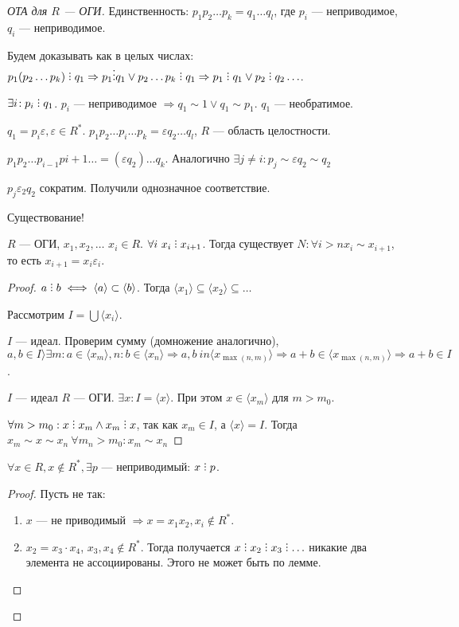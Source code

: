 \begin{proof}[ОТА для $R$ --- ОГИ]
    Единственность: $p_1p_2\ldots p_k =q_1 \ldots q_l$, где $p_i$ --- неприводимое,  $q_i$ --- неприводимое. 

    Будем доказывать как в целых числах:  $p_1(p_2\ldots p_k) \divby q_1 \Rightarrow p_1 \vdots q_1 \lor p_2\ldots p_k \divby q_1 \Rightarrow p_1 \divby q_1 \lor p_2 \divby q_2 \ldots$.

     $\exists i\!: p_i \divby q_1$. $p_i$ --- неприводимое $\Rightarrow q_1 \sim 1 \lor q_1 \sim p_1$. $q_1$ --- необратимое.

     $q_1 = p_i \varepsilon, \varepsilon \in R^*$. $p_1p_2\ldots p_i \ldots p_k = \varepsilon q_2 \ldots q_l$, $R$ --- область целостности.

     $p_1p_2\ldots p_{i-1}p{i+1}\ldots = (\varepsilon q_2) \ldots q_k$. Аналогично $\exists j \neq i\!: p_j \sim \varepsilon q_2 \sim q_2$ 

     $p_j \varepsilon_2 q_2$ сократим. Получили однозначное соответствие. 


     Существование!
     \begin{lemma}
    $R$ --- ОГИ,  $x_1,x_2,\ldots$ $x_i \in R$.  $\forall i\ x_i \divby x_{i+1}$. Тогда существует  $N\!: \forall i > n x_i \sim x_{i+1}$, то есть  $x_{i+1} = x_i \varepsilon_i$. 
    \end{lemma}
    \begin{proof}
        $a \divby b \iff \langle a \rangle \subset \langle b \rangle$. Тогда  $\langle x_1 \rangle \subseteq \langle x_2 \rangle \subseteq \ldots$

        Рассмотрим $I = \bigcup \langle x_i\rangle$.

        $I$ --- идеал. Проверим сумму (домножение аналогично),  $a, b \in I \rangle \exists m\!: a \in \langle x_m \rangle, n\!: b \in \langle x_n \rangle \Rightarrow a, b\ in \langle x_{\max(n, m)} \rangle \Rightarrow a + b \in \langle x_{\max(n, m)} \rangle \Rightarrow a + b \in I$.

        $I$ --- идеал  $R$ --- ОГИ.  $\exists x\!: I = \langle x \rangle$. При этом $x \in \langle x_m \rangle$ для  $m > m_0$.

        $\forall m > m_0: x \divby x_m \land x_m \divby x$, так как $x_m \in I$, а  $\langle x \rangle = I$. Тогда  $x_m \sim x \sim x_n\ \forall m_n > m_0\!: x_m \sim x_n$
    \end{proof}
    \begin{consequence}
        $\forall x \in R, x \not \in R^*,  \exists p$ --- неприводимый:  $x \divby p$.
    \end{consequence}
    \begin{proof}
        Пусть не так:
        \begin{enumerate}
            \item $x$ --- не приводимый  $\Rightarrow x = x_1x_2, x_i \not \in R^*$.
            \item $x_2 = x_3 \cdot x_4$, $x_3, x_4 \not \in R^*$. Тогда получается $x \divby x_2 \divby x_3 \divby \ldots$ никакие два элемента не ассоциированы. Этого не может быть по лемме. 
        \end{enumerate}


\end{proof}
\end{proof}
